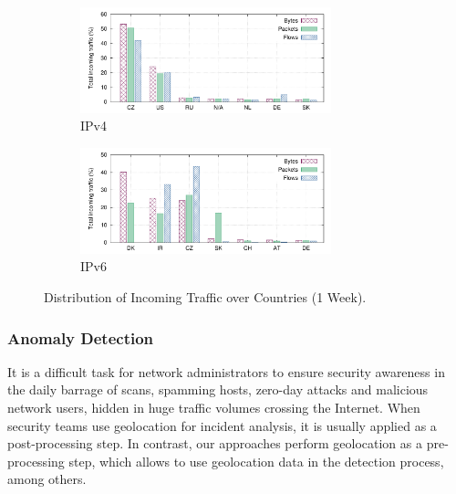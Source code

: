 \begin{figure}[!tb]
    \centering
    \begin{subfigure}[t]{\textwidth}
        \centering
        \includegraphics[width=0.8\textwidth]{figures/paper-geolocation/ipv4-ctry-breakdown/ipv4-ctry-breakdown-in}
        \caption{IPv4}
        \label{fig:geo-ipv4-traffic}
    \end{subfigure}%
    \hfill
    \begin{subfigure}[t]{\textwidth}
        \centering
        \includegraphics[width=0.8\textwidth]{figures/paper-geolocation/ipv6-ctry-breakdown/ipv6-ctry-breakdown-in}
        \caption{IPv6}
        \label{fig:geo-ipv6-traffic}
    \end{subfigure}
    \caption{Distribution of Incoming Traffic over Countries (1 Week).}
    \label{fig:geo-ip_ctry_breakdown}
\end{figure}

\subsubsection{Anomaly Detection}

It is a difficult task for network administrators to ensure security awareness in the daily barrage of scans, spamming hosts, zero-day attacks and malicious network users, hidden in huge traffic volumes crossing the Internet. When security teams use geolocation for incident analysis, it is usually applied as a post-processing step. In contrast, our approaches perform geolocation as a pre-processing step, which allows to use geolocation data in the detection process, among others.

